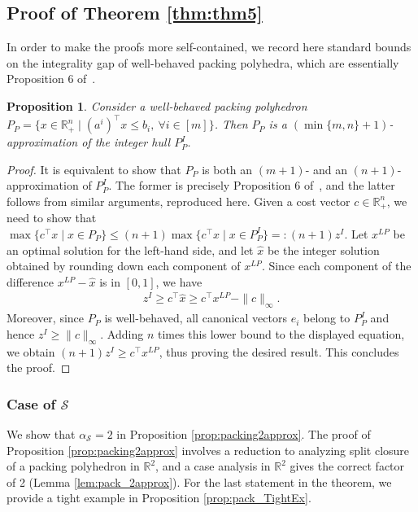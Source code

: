 \documentclass[11pt]{article}
\newcommand{\R}{\mathbb{R}}
\renewcommand{\S}{\mathcal{S}}
\newtheorem{proposition}{Proposition}
\newcommand{\cred}{\color{black}}
\begin{document}
\subsection{Proof of Theorem \ref{thm:thm5}}

{\cred In order to make the proofs more self-contained, we record here standard bounds on the integrality gap of well-behaved packing polyhedra, which are essentially Proposition 6 of~\cite{bodur2016aggregation}.
	
	\begin{proposition} \label{prop:intGapPack}
		Consider a well-behaved packing polyhedron $P_P = \{x \in \R^n_+ \mid (a^i)^{\top} x \le b_i,~\forall i \in [m]\}$. Then $P_P$ is a $(\min\{m,n\} + 1)$-approximation of the integer hull $P_P^I$.
	\end{proposition}
	
	\begin{proof}
		It is equivalent to show that $P_P$ is both an $(m+1)$- and an $(n+1)$-approximation of $P_P^I$. The former is precisely Proposition 6 of~\cite{bodur2016aggregation}, and the latter follows from similar arguments, reproduced here. Given a cost vector $c \in \R^n_+$, we need to show that $\max\{c^\top x \mid x \in P_P\} \le (n + 1) \max\{c^\top x \mid x \in P_P^I\} =: (n+1) z^I$. Let $x^{LP}$ be an optimal solution for the left-hand side, and let $\hat{x}$ be the integer solution obtained by rounding down each component of $x^{LP}$. Since each component of the difference $x^{LP} - \hat{x}$ is in $[0,1]$, we have 
		\begin{align*}
			z^I \ge c^\top \hat{x} \ge c^{\top} x^{LP} - \|c\|_{\infty}.
		\end{align*}
		Moreover, since $P_P$ is well-behaved, all canonical vectors $e_i$ belong to $P_P^I$ and hence $z^I \ge \|c\|_{\infty}$. Adding $n$ times this lower bound to the displayed equation, we obtain $(n+1)z^I \ge c^{\top} x^{LP}$, thus proving the desired result. This concludes the proof. 
	\end{proof}

	}
	
\subsubsection{Case of $\S$}
\label{subsubsec:4.5.1}

We show that $\alpha_\S = 2$ in Proposition \ref{prop:packing2approx}. The proof of Proposition \ref{prop:packing2approx} involves a reduction to analyzing split closure of a packing polyhedron in $\R^2$, and a case analysis in $\R^2$ gives the correct factor of 2 (Lemma \ref{lem:pack_2approx}). For the last statement in the theorem, we provide a tight example in Proposition \ref{prop:pack_TightEx}.
\end{document}
